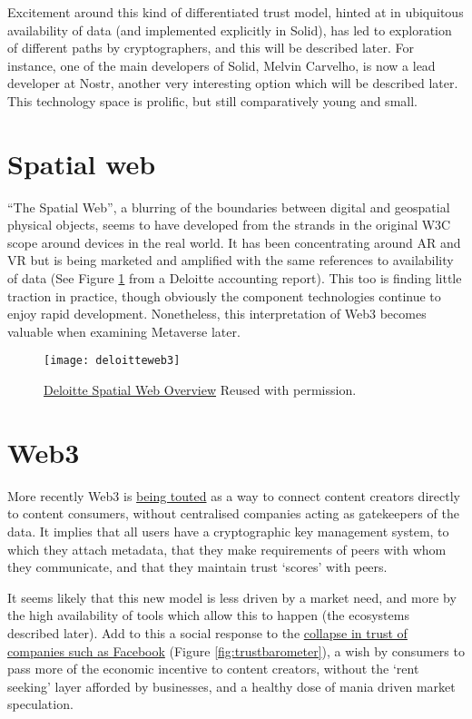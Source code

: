 Excitement around this kind of differentiated trust model, hinted at in ubiquitous availability of data (and implemented explicitly in Solid), has led to exploration of different paths by cryptographers, and this will be described later. For instance, one of the main developers of Solid, Melvin Carvelho, is now a lead developer at Nostr, another very interesting option which will be described later. This technology space is prolific, but still comparatively young and small.\par
\section{Spatial web}
``The Spatial Web'', a blurring of the boundaries between digital and geospatial physical objects, seems to have developed from the strands in the original W3C scope around devices in the real world. It has been concentrating around AR and VR but is being marketed and amplified with the same references to availability of data (See Figure \ref{fig:deloitteSpatial} from a Deloitte accounting report). This too is finding little traction in practice, though obviously the component technologies continue to enjoy rapid development. Nonetheless, this interpretation of Web3 becomes valuable when examining Metaverse later.\par
\begin{figure}
  \centering
    \texttt{[image: deloitteweb3]}
  \caption{\href{https://www2.deloitte.com/us/en/insights/topics/digital-transformation/web-3-0-technologies-in-business.html}{Deloitte Spatial Web Overview} Reused with permission.}
  \label{fig:deloitteSpatial}
\end{figure}
\section{Web3}
More recently Web3 is \href{https://trends.google.com/trends/explore?date=all&q=web3}{being touted} as a way to connect content creators directly to content consumers, without centralised companies acting as gatekeepers of the data. It implies that all users have a cryptographic key management system, to which they attach metadata, that they make requirements of peers with whom they communicate, and that they maintain trust `scores' with peers.\par
It seems likely that this new model is less driven by a market need, and more by the high availability of tools which allow this to happen (the ecosystems described later). Add to this a social response to the \href{https://finance.yahoo.com/news/meta-facebook-worst-company-of-the-year-yahoo-finance-165345819.html}{collapse in trust of companies such as Facebook} (Figure \ref{fig:trustbarometer}), a wish by consumers to pass more of the economic incentive to content creators, without the `rent seeking' layer afforded by businesses, and a healthy dose of mania driven market speculation. 

